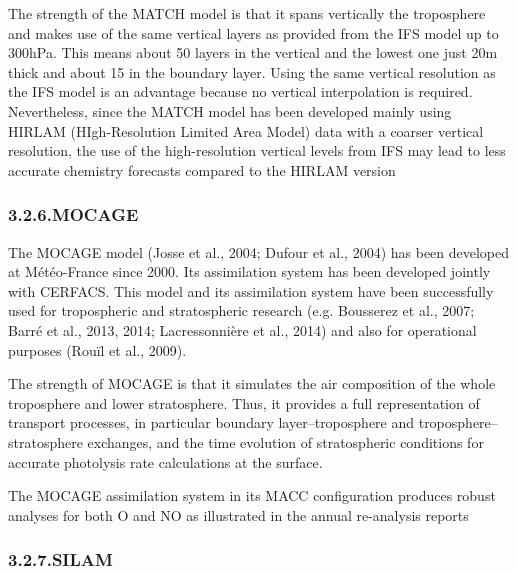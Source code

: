 \documentclass[9pt]{report}
\begin{document}
The strength of the MATCH model is that it spans vertically the troposphere and makes use of the same vertical layers as provided from the IFS model up to 300hPa. This means about 50 layers in the vertical and the lowest one just 20m thick and about 15 in the boundary layer. 
Using the same vertical resolution as the IFS model is an advantage because no vertical interpolation is required. 
Nevertheless, since the MATCH model has been developed mainly using HIRLAM (HIgh-Resolution Limited Area Model) data with a coarser vertical resolution, the use of the high-resolution vertical levels from IFS may lead to less accurate chemistry forecasts compared to the HIRLAM version%

\subsubsection{3.2.6.\hspace*{0.5em}MOCAGE}\label{sec-mocage}%

\noindent{}The MOCAGE model (Josse et al., 2004; Dufour et al., 2004) has been developed at Météo-France since 2000. 
Its assimilation system has been developed jointly with CERFACS. 
This model and its assimilation system have been successfully used for tropospheric and stratospheric research (e.g. Bousserez et al., 2007; Barré et al., 2013, 2014; Lacressonnière et al., 2014) and also for operational purposes (Rouïl et al., 2009).%

The strength of MOCAGE is that it simulates the air composition of the whole troposphere and lower stratosphere. 
Thus, it provides a full representation of transport processes, in particular boundary layer–troposphere and troposphere–stratosphere exchanges, and the time evolution of stratospheric conditions for accurate photolysis rate calculations at the surface.%

The MOCAGE assimilation system in its MACC conﬁguration produces robust analyses for both O and NO as illustrated in the annual re-analysis reports %

\subsubsection{3.2.7.\hspace*{0.5em}SILAM}\label{sec-silam}%
\end{document}
